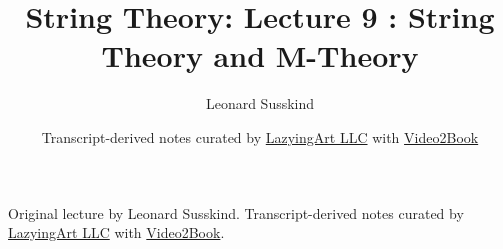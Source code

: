 \documentclass[11pt,oneside]{book}
\begin{document}
\frontmatter
\title{String Theory: Lecture 9 : String Theory and M-Theory}
\author{Leonard Susskind}
\date{Transcript-derived notes curated by \href{https://lazying.art}{LazyingArt LLC} with \href{https://github.com/lachlanchen/Video2Book}{Video2Book}}
\maketitle
\begin{center}
\small Original lecture by Leonard Susskind. Transcript-derived notes curated by \href{https://lazying.art}{LazyingArt LLC} with \href{https://github.com/lachlanchen/Video2Book}{Video2Book}.
\end{center}
\clearpage
\mainmatter

\end{document}
